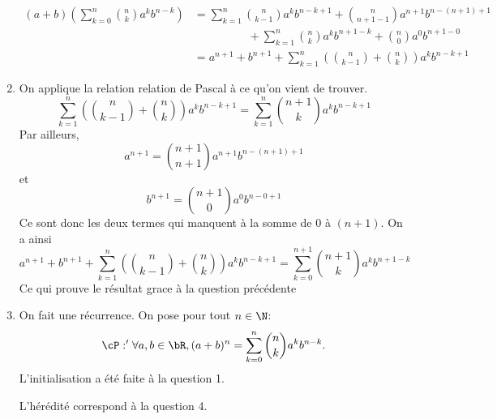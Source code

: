\documentclass[a4paper, 11pt,reqno]{article}
\begin{document}
\begin{correction}
\begin{enumerate}
\begin{align*}
(a+b)\left( \sum_{k=0}^n \binom{n}{k}a^k b^{n-k}\right) &= \sum_{k=1}^{n} \binom{n}{k-1}a^{k} b^{n-k+1}+\binom{n}{n+1-1}a^{n+1} b^{n-(n+1)+1} \\& \hspace{2cm} +\sum_{k=1}^{n} \binom{n}{k}a^{k} b^{n+1-k} + \binom{n}{0}a^{0} b^{n+1-0} \\
&=  a^{n+1}+b^{n+1}+\sum_{k=1}^{n} \left( \binom{n}{k-1}+\binom{n}{k}\right)a^{k} b^{n-k+1}
\end{align*}


\item 

On applique la relation relation de Pascal à ce qu'on vient de trouver. 
$$\sum_{k=1}^{n} \left( \binom{n}{k-1}+\binom{n}{k}\right)a^{k} b^{n-k+1} = \sum_{k=1}^{n} \binom{n+1}{k}a^{k} b^{n-k+1}$$
Par ailleurs, 
$$a^{n+1} = \binom{n+1}{n+1}a^{n+1} b^{n-(n+1)+1}$$
et 
$$b^{n+1} = \binom{n+1}{0}a^{0} b^{n-0+1}$$
Ce sont donc les deux termes qui manquent à la somme de $0$ à $(n+1)$. On a ainsi 
$$a^{n+1}+b^{n+1}+\sum_{k=1}^{n} \left( \binom{n}{k-1}+\binom{n}{k}\right)a^{k} b^{n-k+1} =\sum_{k=0}^{n+1}  \binom{n+1}{k}a^{k} b^{n+1-k}$$
Ce qui prouve le résultat grace à la question précédente




\item 



On fait une récurrence. On pose pour tout $n\in \N$:
$$\cP :' \forall a, b\in \bR, (a+b)^n =\sum_{k=0}^n \binom{n}{k}a^k b^{n-k}.$$
L'initialisation a été faite à la question 1.

L'hérédité correspond à la question 4. 

\end{enumerate}
 


\end{correction}
\end{document}
